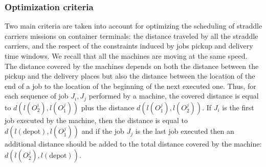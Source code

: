 \documentclass[a4paper,12pt]{article}
\begin{document}
\subsubsection{Optimization criteria}

Two main criteria are taken into account for optimizing the scheduling of straddle carriers missions on container terminals: the distance traveled by all the straddle carriers, and the respect of the constraints induced by jobs pickup and delivery time windows. We recall that all the machines are moving at the same speed. \\

The distance covered by the machines depends on both the distance between the pickup and the delivery places but also the distance between the location of the end of a job to the location of the beginning of the next executed one. Thus, for each sequence of job $J_i,J_j$ performed by a machine, the covered distance is equal to $d(l(O^i_2), l(O^j_1))$ plus the distance $d(l(O^j_1), l(O^j_2))$. If $J_i$ is the first job executed by the machine, then the distance is equal to $d(l(\mbox{depot}),l(O^j_1))$ and if the job $J_j$ is the last job executed then an additional distance should be added to the total distance covered by the machine: $d(l(O^j_2),l(\mbox{depot}))$.

%


%
\end{document}
